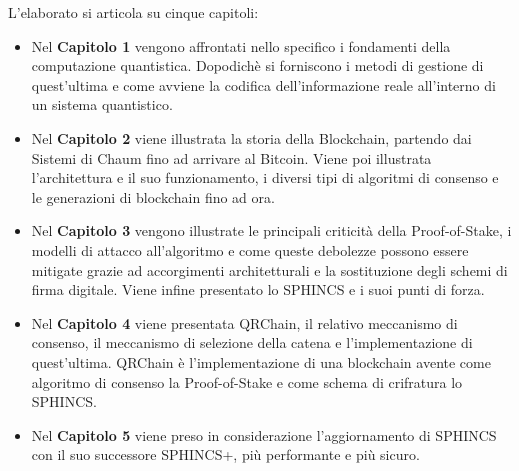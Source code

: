 L'elaborato si articola su cinque capitoli:
\begin{itemize}
  \item Nel \textbf{Capitolo 1} vengono affrontati nello specifico i fondamenti della computazione quantistica. Dopodichè si forniscono i metodi di gestione di quest'ultima e come avviene la codifica dell'informazione reale all'interno di un sistema quantistico.
  \item Nel \textbf{Capitolo 2} viene illustrata la storia della Blockchain, partendo dai Sistemi di Chaum fino ad arrivare al Bitcoin. Viene poi illustrata l'architettura e il suo funzionamento, i diversi tipi di algoritmi di consenso e le generazioni di blockchain fino ad ora.
  \item Nel \textbf{Capitolo 3} vengono illustrate le principali criticità della Proof-of-Stake, i modelli di attacco all'algoritmo e come queste debolezze possono essere mitigate grazie ad accorgimenti architetturali e la sostituzione degli schemi di firma digitale. Viene infine presentato lo SPHINCS e i suoi punti di forza.
  \item Nel \textbf{Capitolo 4} viene presentata QRChain, il relativo meccanismo di consenso, il meccanismo di selezione della catena e l'implementazione di quest'ultima. QRChain è l'implementazione di una blockchain avente come algoritmo di consenso la Proof-of-Stake e come schema di crifratura lo SPHINCS.
  \item Nel \textbf{Capitolo 5} viene preso in considerazione l'aggiornamento di SPHINCS con il suo successore SPHINCS+, più performante e più sicuro.
\end{itemize}
